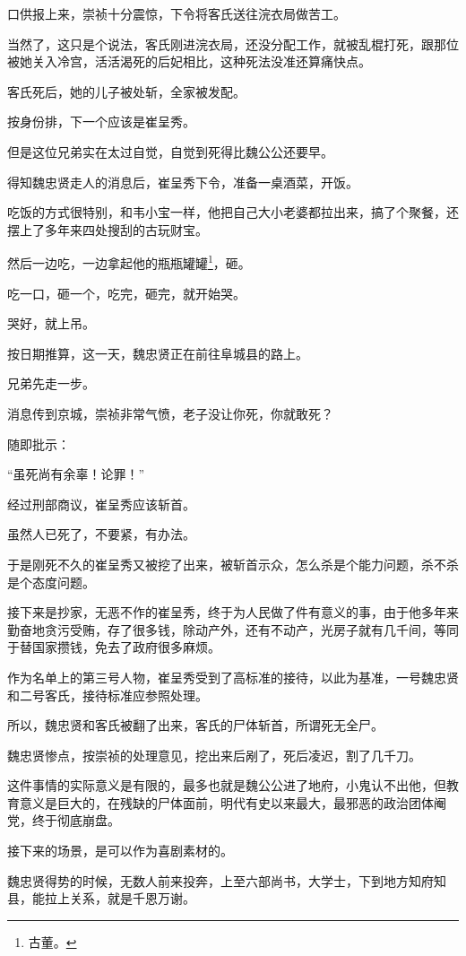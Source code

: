 \begin{multicols}{\theparacolNo}
口供报上来，崇祯十分震惊，下令将客氏送往浣衣局做苦工。

当然了，这只是个说法，客氏刚进浣衣局，还没分配工作，就被乱棍打死，跟那位被她关入冷宫，活活渴死的后妃相比，这种死法没准还算痛快点。

客氏死后，她的儿子被处斩，全家被发配。

按身份排，下一个应该是崔呈秀。

但是这位兄弟实在太过自觉，自觉到死得比魏公公还要早。

得知魏忠贤走人的消息后，崔呈秀下令，准备一桌酒菜，开饭。

吃饭的方式很特别，和韦小宝一样，他把自己大小老婆都拉出来，搞了个聚餐，还摆上了多年来四处搜刮的古玩财宝。

然后一边吃，一边拿起他的瓶瓶罐罐\footnote{古董。}，砸。

吃一口，砸一个，吃完，砸完，就开始哭。

哭好，就上吊。

按日期推算，这一天，魏忠贤正在前往阜城县的路上。

兄弟先走一步。

消息传到京城，崇祯非常气愤，老子没让你死，你就敢死？

随即批示：

“虽死尚有余辜！论罪！”

经过刑部商议，崔呈秀应该斩首。

虽然人已死了，不要紧，有办法。

于是刚死不久的崔呈秀又被挖了出来，被斩首示众，怎么杀是个能力问题，杀不杀是个态度问题。

接下来是抄家，无恶不作的崔呈秀，终于为人民做了件有意义的事，由于他多年来勤奋地贪污受贿，存了很多钱，除动产外，还有不动产，光房子就有几千间，等同于替国家攒钱，免去了政府很多麻烦。

作为名单上的第三号人物，崔呈秀受到了高标准的接待，以此为基准，一号魏忠贤和二号客氏，接待标准应参照处理。

所以，魏忠贤和客氏被翻了出来，客氏的尸体斩首，所谓死无全尸。

魏忠贤惨点，按崇祯的处理意见，挖出来后剐了，死后凌迟，割了几千刀。

这件事情的实际意义是有限的，最多也就是魏公公进了地府，小鬼认不出他，但教育意义是巨大的，在残缺的尸体面前，明代有史以来最大，最邪恶的政治团体阉党，终于彻底崩盘。

接下来的场景，是可以作为喜剧素材的。

魏忠贤得势的时候，无数人前来投奔，上至六部尚书，大学士，下到地方知府知县，能拉上关系，就是千恩万谢。


\end{multicols}
